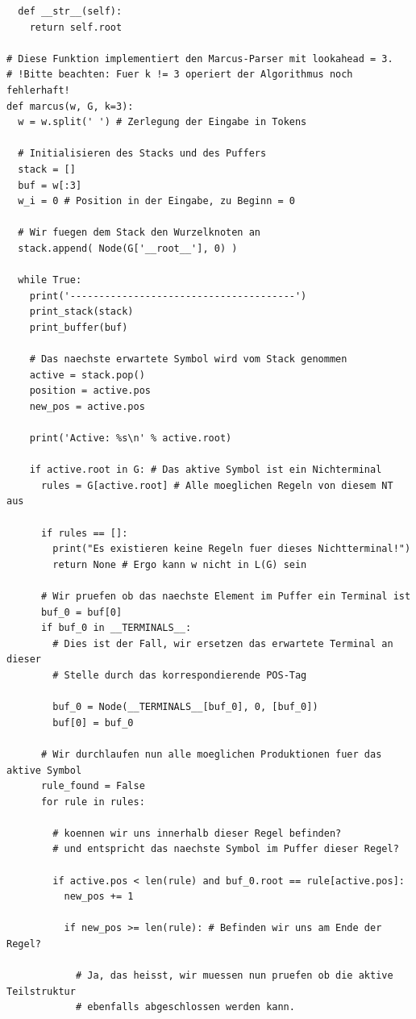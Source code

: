 \documentclass[12pt,a4paper]{article}
\theoremstyle{definition}
\begin{document}
\begin{verbatim}
  def __str__(self):
    return self.root

# Diese Funktion implementiert den Marcus-Parser mit lookahead = 3.
# !Bitte beachten: Fuer k != 3 operiert der Algorithmus noch fehlerhaft!
def marcus(w, G, k=3):
  w = w.split(' ') # Zerlegung der Eingabe in Tokens

  # Initialisieren des Stacks und des Puffers
  stack = []
  buf = w[:3]
  w_i = 0 # Position in der Eingabe, zu Beginn = 0

  # Wir fuegen dem Stack den Wurzelknoten an
  stack.append( Node(G['__root__'], 0) )
  
  while True:
    print('---------------------------------------')
    print_stack(stack)
    print_buffer(buf)
    
    # Das naechste erwartete Symbol wird vom Stack genommen
    active = stack.pop()
    position = active.pos
    new_pos = active.pos

    print('Active: %s\n' % active.root)
    
    if active.root in G: # Das aktive Symbol ist ein Nichterminal
      rules = G[active.root] # Alle moeglichen Regeln von diesem NT aus
      
      if rules == []:
        print("Es existieren keine Regeln fuer dieses Nichtterminal!")
        return None # Ergo kann w nicht in L(G) sein

      # Wir pruefen ob das naechste Element im Puffer ein Terminal ist
      buf_0 = buf[0]
      if buf_0 in __TERMINALS__:
        # Dies ist der Fall, wir ersetzen das erwartete Terminal an dieser
        # Stelle durch das korrespondierende POS-Tag
        
        buf_0 = Node(__TERMINALS__[buf_0], 0, [buf_0])
        buf[0] = buf_0

      # Wir durchlaufen nun alle moeglichen Produktionen fuer das aktive Symbol
      rule_found = False
      for rule in rules:

        # koennen wir uns innerhalb dieser Regel befinden?
        # und entspricht das naechste Symbol im Puffer dieser Regel?
        
        if active.pos < len(rule) and buf_0.root == rule[active.pos]:
          new_pos += 1
                    
          if new_pos >= len(rule): # Befinden wir uns am Ende der Regel?
            
            # Ja, das heisst, wir muessen nun pruefen ob die aktive Teilstruktur
            # ebenfalls abgeschlossen werden kann.
          

\end{verbatim}
\end{document}
